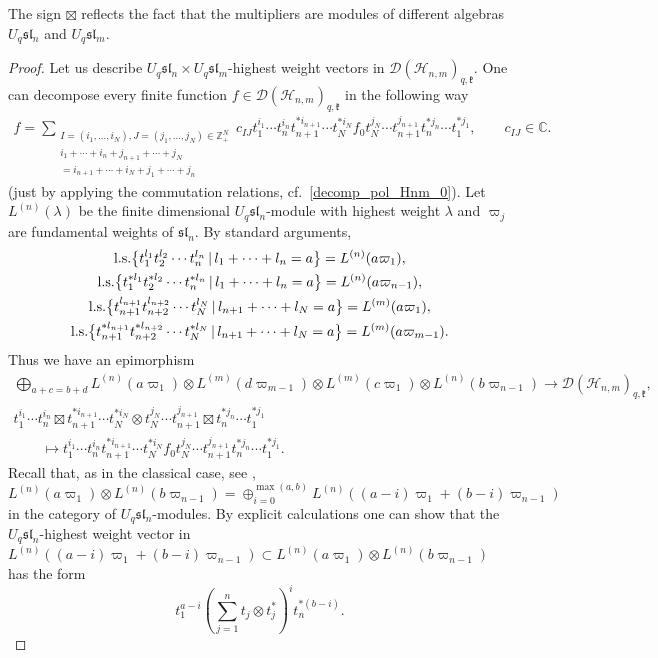 \documentclass[11pt]{article}
\begin{document}
\begin{remark}
The sign $\boxtimes$ ref\/lects the fact that the multipliers are modules of dif\/ferent algebras $U_q
\mathfrak{sl}_n$ and $U_q \mathfrak{sl}_m$.
\end{remark}

\begin{proof} Let us describe $U_q \mathfrak{sl}_n \times U_q \mathfrak{sl}_m$-highest weight vectors in
$\mathscr{D}(\mathscr{H}_{n,m})_{q,\mathfrak{k}}$. One can decompose every f\/inite function $f \in
\mathscr{D}(\mathscr{H}_{n,m})_{q,\mathfrak{k}}$ in the following way
\begin{gather*}
f= \sum_{\substack{I=(i_1,\ldots,i_N), J=(j_1,\ldots,j_N) \in \mathbb Z_+^N \\ i_1+\cdots +
i_n+j_{n+1}+\cdots +j_N\\ = i_{n+1}+\cdots+i_N+j_1+\cdots +j_n}} \!\!\!\!\!c_{IJ}t_1^{i_1}\cdots
t_n^{i_n}t_{n+1}^{*i_{n+1}}\cdots t_N^{*i_N}f_0t_N^{j_N}\cdots t_{n+1}^{j_{n+1}}t_n^{*j_n}\cdots t_1^{*j_1},
\qquad c_{IJ} \in \mathbb C.
\end{gather*}
(just by applying the commutation relations, cf.~\eqref{decomp_pol_Hnm_0}). Let $L^{(n)}(\lambda)$ be the
f\/inite dimensional $U_q \mathfrak{sl}_n$-module with highest weight $\lambda$ and $\varpi_j$ are fundamental
weights of $\mathfrak{sl}_n$. By standard arguments,
\begin{gather*}
 {\rm l.s.}\big\{t_1^{l_1}t_2^{l_2}\cdots t_n^{l_n}\,|\,l_1+\cdots+l_n=a\big\}=L^{(n)}(a\varpi_1),
\\  {\rm l.s.}\big\{t_1^{*l_1}t_2^{*l_2}\cdots t_n^{*l_n}\,|\,l_1+\cdots+l_n=a\big\}=L^{(n)}(a\varpi_{n-1}),
\\  {\rm l.s.}\big\{t_{n+1}^{l_{n+1}}t_{n+2}^{l_{n+2}}\cdots t_N^{l_N}\,|\, l_{n+1}+\cdots+l_N=a\big\}=L^{(m)}(a\varpi_1),
\\  {\rm l.s.}\big\{t_{n+1}^{*l_{n+1}}t_{n+2}^{*l_{n+2}}\cdots
t_N^{*l_N}\,|\,l_{n+1}+\cdots+l_N=a\big\}=L^{(m)}(a\varpi_{m-1}).
\end{gather*}
Thus we have an epimorphism
\begin{gather*}
\bigoplus_{a+c=b+d} L^{(n)}(a\varpi_1) \otimes  L^{(m)}(d\varpi_{m-1}) \otimes L^{(m)}(c\varpi_1) \otimes
L^{(n)}(b\varpi_{n-1}) \rightarrow \mathscr{D}(\mathscr{H}_{n,m})_{q,\mathfrak{k}},
\\
t_1^{i_1}\cdots t_n^{i_n} \boxtimes t_{n+1}^{*i_{n+1}}\cdots t_N^{*i_N} \otimes t_N^{j_N}\cdots
t_{n+1}^{j_{n+1}} \boxtimes t_n^{*j_n}\cdots t_1^{*j_1}\\
\qquad{} \mapsto t_1^{i_1}\cdots t_n^{i_n}
t_{n+1}^{*i_{n+1}}\cdots t_N^{*i_N}f_0t_N^{j_N}\cdots t_{n+1}^{j_{n+1}}t_n^{*j_n}\cdots t_1^{*j_1}.
\end{gather*}
Recall that, as in the classical case, see \cite{VO},
\[
L^{(n)}(a\varpi_1) \otimes L^{(n)}(b\varpi_{n-1}) = \oplus_{i=0}^{\max(a,b)}
L^{(n)}((a-i)\varpi_1+(b-i)\varpi_{n-1})
\]
in the category of $U_q \mathfrak{sl}_n$-modules. By explicit calculations one can show that the $U_q
\mathfrak{sl}_n$-highest weight vector in $L^{(n)}((a-i)\varpi_1+(b-i)\varpi_{n-1}) \subset
L^{(n)}(a\varpi_1) \otimes L^{(n)}(b\varpi_{n-1})$ has the form
\[
t_1^{a-i}  \left(\sum_{j=1}^nt_j
\otimes t_j^*\right)^{i}   t_n^{*(b-i)}.
\]


\end{proof}
\end{document}
